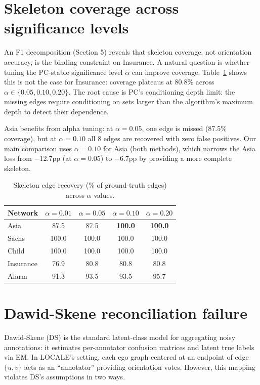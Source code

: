 \documentclass{article}
\begin{document}
\section{Skeleton coverage across significance levels}
\label{app:alpha}

An F1 decomposition (Section 5) reveals that skeleton coverage, not orientation accuracy, is the binding constraint on Insurance. A natural question is whether tuning the PC-stable significance level $\alpha$ can improve coverage. Table~\ref{tab:alpha} shows this is not the case for Insurance: coverage plateaus at 80.8\% across $\alpha \in \{0.05, 0.10, 0.20\}$. The root cause is PC's conditioning depth limit: the missing edges require conditioning on sets larger than the algorithm's maximum depth to detect their dependence.

Asia benefits from alpha tuning: at $\alpha{=}0.05$, one edge is missed (87.5\% coverage), but at $\alpha{=}0.10$ all 8 edges are recovered with zero false positives. Our main comparison uses $\alpha{=}0.10$ for Asia (both methods), which narrows the Asia loss from $-$12.7pp (at $\alpha{=}0.05$) to $-$6.7pp by providing a more complete skeleton.

\begin{table}[h]
\centering
\caption{Skeleton edge recovery (\% of ground-truth edges) across $\alpha$ values.}
\small
\begin{tabular}{lcccc}
\toprule
Network & $\alpha{=}0.01$ & $\alpha{=}0.05$ & $\alpha{=}0.10$ & $\alpha{=}0.20$ \\
\midrule
Asia      & 87.5 & 87.5 & \textbf{100.0} & \textbf{100.0} \\
Sachs     & 100.0 & 100.0 & 100.0 & 100.0 \\
Child     & 100.0 & 100.0 & 100.0 & 100.0 \\
Insurance & 76.9 & 80.8 & 80.8 & 80.8 \\
Alarm     & 91.3 & 93.5 & 93.5 & 95.7 \\
\bottomrule
\end{tabular}
\label{tab:alpha}
\end{table}


\section{Dawid-Skene reconciliation failure}
\label{app:ds}

Dawid-Skene (DS) is the standard latent-class model for aggregating noisy annotations: it estimates per-annotator confusion matrices and latent true labels via EM. In LOCALE's setting, each ego graph centered at an endpoint of edge $\{u,v\}$ acts as an ``annotator'' providing orientation votes. However, this mapping violates DS's assumptions in two ways.
\end{document}
